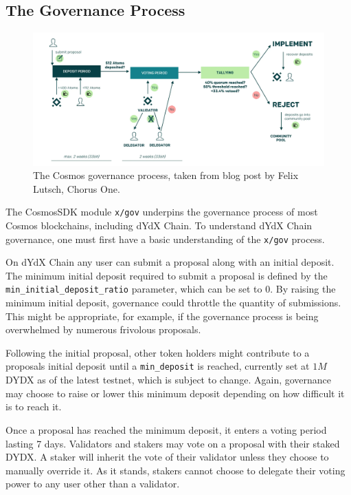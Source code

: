     \subsection{The Governance Process}

        \begin{figure}[htp]
            \centering
            \includegraphics[width=\linewidth]{figs/cosmos_gov.png}
            \caption{The Cosmos governance process, taken from  blog post by Felix Lutsch, Chorus One.}
            \label{fig:cosmos_gov}
        \end{figure}

        The CosmosSDK module \texttt{x/gov} underpins the governance process of most Cosmos blockchains, including dYdX Chain. To understand dYdX Chain governance, one must first have a basic understanding of the \texttt{x/gov} process.

        On dYdX Chain any user can submit a proposal along with an initial deposit. The minimum initial deposit required to submit a proposal is defined by the \texttt{min\_initial\_deposit\_ratio} parameter, which can be set to $0$. By raising the minimum initial deposit, governance could throttle the quantity of submissions. This might be appropriate, for example, if the governance process is being overwhelmed by numerous frivolous proposals.

        Following the initial proposal, other token holders might contribute to a proposals initial deposit until a \texttt{min\_deposit} is reached, currently set at $1M$ DYDX as of the latest testnet, which is subject to change. Again, governance may choose to raise or lower this minimum deposit depending on how difficult it is to reach it.

        Once a proposal has reached the minimum deposit, it enters a voting period lasting 7 days. Validators and stakers may vote on a proposal with their staked DYDX. A staker will inherit the vote of their validator unless they choose to manually override it. As it stands, stakers cannot choose to delegate their voting power to any user other than a validator.

